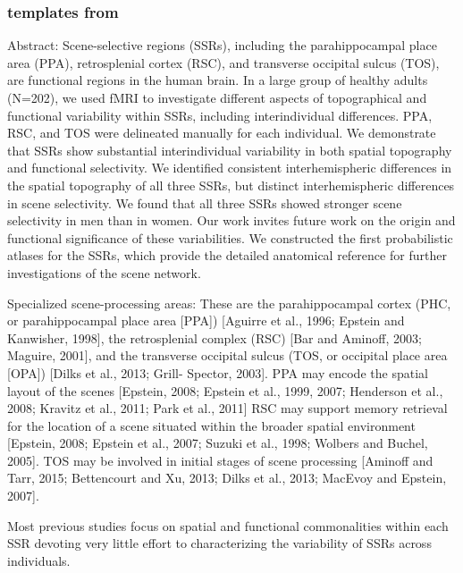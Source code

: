 \subsubsection{templates from \citet{zhen2017quantifying}}


Abstract: Scene-selective regions (SSRs), including the parahippocampal place
area (PPA), retrosplenial cortex (RSC), and transverse occipital sulcus (TOS),
are functional regions in the human brain.
%
In a large group of healthy adults (N=202), we used fMRI to investigate
different aspects of topographical and functional variability within SSRs,
including interindividual differences.
%
PPA, RSC, and TOS were delineated manually for each individual.
%
We demonstrate that SSRs show substantial interindividual variability in both
spatial topography and functional selectivity.
%
We identified consistent interhemispheric differences in the spatial topography
of all three SSRs, but distinct interhemispheric differences in scene
selectivity.
%
We found that all three SSRs showed stronger scene selectivity in men than in
women.
%
Our work invites future work on the origin and functional significance of these
variabilities.
%
We constructed the first probabilistic atlases for the SSRs, which
provide the detailed anatomical reference for further investigations of the
scene network.

Specialized scene-processing areas:
%
These are the parahippocampal cortex (PHC, or parahippocampal place area [PPA])
[Aguirre et al., 1996; Epstein and Kanwisher, 1998], the retrosplenial complex
(RSC) [Bar and Aminoff, 2003; Maguire, 2001], and the transverse occipital
sulcus (TOS, or occipital place area [OPA]) [Dilks et al., 2013; Grill- Spector,
2003].
%
PPA may encode the spatial layout of the scenes [Epstein, 2008; Epstein et al.,
1999, 2007; Henderson et al., 2008; Kravitz et al., 2011; Park et al., 2011]
%
RSC may support memory retrieval for the location of a scene situated within the
broader spatial environment [Epstein, 2008; Epstein et al., 2007; Suzuki et al.,
1998; Wolbers and Buchel, 2005].
%
TOS may be involved in initial stages of scene processing [Aminoff and Tarr,
2015; Bettencourt and Xu, 2013; Dilks et al., 2013; MacEvoy and Epstein, 2007].

%
Most previous studies focus on spatial and functional commonalities within each SSR devoting very little effort to characterizing the variability of SSRs across
individuals.


